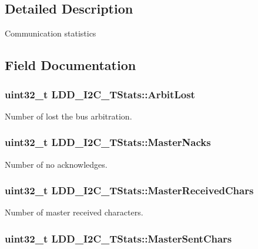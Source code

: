 \subsection{Detailed Description}
Communication statistics 

\subsection{Field Documentation}
\hypertarget{struct_l_d_d___i2_c___t_stats_ac11389cb67b62b2dd63ac5390c47c1b1}{
\subsubsection[{Arbit\-Lost}]{\setlength{\rightskip}{0pt plus 5cm}uint32\-\_\-t L\-D\-D\-\_\-\-I2\-C\-\_\-\-T\-Stats\-::\-Arbit\-Lost}}\label{struct_l_d_d___i2_c___t_stats_ac11389cb67b62b2dd63ac5390c47c1b1}
Number of lost the bus arbitration. \hypertarget{struct_l_d_d___i2_c___t_stats_a451fe2a61e5c5dac8f1846987ad47af8}{
\subsubsection[{Master\-Nacks}]{\setlength{\rightskip}{0pt plus 5cm}uint32\-\_\-t L\-D\-D\-\_\-\-I2\-C\-\_\-\-T\-Stats\-::\-Master\-Nacks}}\label{struct_l_d_d___i2_c___t_stats_a451fe2a61e5c5dac8f1846987ad47af8}
Number of no acknowledges. \hypertarget{struct_l_d_d___i2_c___t_stats_a3278bb4aa5e4223e199e9aee14e8f2fe}{
\subsubsection[{Master\-Received\-Chars}]{\setlength{\rightskip}{0pt plus 5cm}uint32\-\_\-t L\-D\-D\-\_\-\-I2\-C\-\_\-\-T\-Stats\-::\-Master\-Received\-Chars}}\label{struct_l_d_d___i2_c___t_stats_a3278bb4aa5e4223e199e9aee14e8f2fe}
Number of master received characters. \hypertarget{struct_l_d_d___i2_c___t_stats_a9b4d75a976e9c6031513b31948396c6a}{
\subsubsection[{Master\-Sent\-Chars}]{\setlength{\rightskip}{0pt plus 5cm}uint32\-\_\-t L\-D\-D\-\_\-\-I2\-C\-\_\-\-T\-Stats\-::\-Master\-Sent\-Chars}}\label{struct_l_d_d___i2_c___t_stats_a9b4d75a976e9c6031513b31948396c6a}
